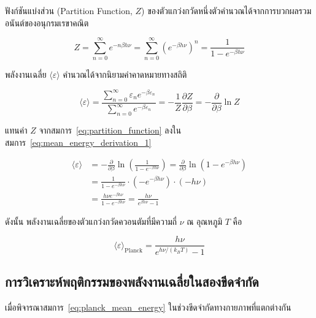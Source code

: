 ฟังก์ชันแบ่งส่วน (Partition Function, $Z$) ของตัวแกว่งกวัดหนึ่งตัวคำนวณได้จากการบวกผลรวมอนันต์ของอนุกรมเรขาคณิต

\begin{equation}
Z = \sum_{n=0}^\infty e^{-n \beta h\nu} = \sum_{n=0}^\infty \left( e^{-\beta h\nu} \right)^n = \frac{1}{1 - e^{-\beta h\nu}}
\label{eq:partition_function}
\end{equation}

พลังงานเฉลี่ย $\langle \varepsilon \rangle$ คำนวณได้จากนิยามค่าคาดหมายทางสถิติ

\begin{equation}
\langle \varepsilon \rangle = \frac{\sum_{n=0}^\infty \varepsilon_n e^{-\beta \varepsilon_n}}{\sum_{n=0}^\infty e^{-\beta \varepsilon_n}} = -\frac{1}{Z}\frac{\partial Z}{\partial \beta} = -\frac{\partial}{\partial \beta}\ln Z
\label{eq:mean_energy_derivation_1}
\end{equation}

แทนค่า $Z$ จากสมการ~\eqref{eq:partition_function} ลงในสมการ~\eqref{eq:mean_energy_derivation_1}

\begin{align}
\langle \varepsilon \rangle &= -\frac{\partial}{\partial \beta} \ln \left( \frac{1}{1 - e^{-\beta h\nu}} \right) = \frac{\partial}{\partial \beta} \ln \left( 1 - e^{-\beta h\nu} \right) \nonumber \\
&= \frac{1}{1 - e^{-\beta h\nu}} \cdot \left( -e^{-\beta h\nu} \right) \cdot (-h\nu) \nonumber \\
&= \frac{h\nu e^{-\beta h\nu}}{1 - e^{-\beta h\nu}} = \frac{h\nu}{e^{\beta h\nu} - 1}
\label{eq:mean_energy_derivation_2}
\end{align}

ดังนั้น พลังงานเฉลี่ยของตัวแกว่งกวัดควอนตัมที่มีความถี่ $\nu$ ณ อุณหภูมิ $T$ คือ

\begin{equation}
\langle \varepsilon \rangle_{\text{Planck}} = \frac{h\nu}{e^{h\nu / (k_B T)} - 1}
\label{eq:planck_mean_energy}
\end{equation}

\subsection{การวิเคราะห์พฤติกรรมของพลังงานเฉลี่ยในสองขีดจำกัด}

เมื่อพิจารณาสมการ~\eqref{eq:planck_mean_energy} ในช่วงขีดจำกัดทางกายภาพที่แตกต่างกัน


